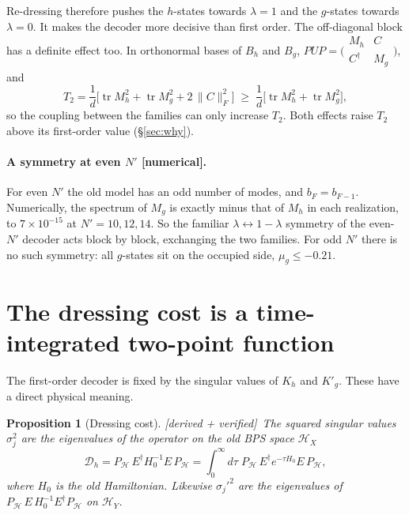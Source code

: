 \documentclass[11pt]{article}
\newcommand{\tr}{\operatorname{tr}}
\newcommand{\Np}{N'}
\newcommand{\Hc}{\mathcal H}
\newcommand{\Kh}{K_h}
\newcommand{\Kg}{{K'_g}}
\newcommand{\tagbox}[2]{\textsf{\small\color{#1}[#2]}}
\newcommand{\VER}{\tagbox{cder}{derived + verified}}
\newcommand{\NUM}{\tagbox{cnum}{numerical}}
\theoremstyle{plain}
\newtheorem{proposition}{Proposition}
\theoremstyle{remark}
\numberwithin{equation}{section}
\begin{document}
Re-dressing therefore pushes the $h$-states towards $\lambda=1$ and the $g$-states towards $\lambda=0$. It makes the decoder
more decisive than first order. The off-diagonal block has a definite effect too. In orthonormal bases of $B_h$ and $B_g$,
$PUP=\big(\begin{smallmatrix}M_h&C\\ C^\dagger&M_g\end{smallmatrix}\big)$, and
\begin{equation}\label{eq:T2mix}
T_2=\frac1d\Big[\tr M_h^2+\tr M_g^2+2\,\|C\|_F^2\Big]\;\ge\;\frac1d\Big[\tr M_h^2+\tr M_g^2\Big],
\end{equation}
so the coupling between the families can only increase $T_2$. Both effects raise $T_2$ above its first-order value
(\S\ref{sec:why}).

\paragraph{A symmetry at even $\Np$ \NUM.} For even $\Np$ the old model has an odd number of modes, and
$b_F=b_{F-1}$. Numerically, the spectrum of $M_g$ is exactly minus that of $M_h$ in each realization, to $7\times10^{-15}$
at $\Np=10,12,14$. So the familiar $\lambda\leftrightarrow1-\lambda$ symmetry of the even-$\Np$ decoder acts block by
block, exchanging the two families. For odd $\Np$ there is no such symmetry: all $g$-states sit on the occupied side,
$\mu_g\le-0.21$.

\section{The dressing cost is a time-integrated two-point function}\label{sec:twopoint}

The first-order decoder is fixed by the singular values of $\Kh$ and $\Kg$. These have a direct physical meaning.

\begin{proposition}[Dressing cost]\label{prop:twopoint}\VER\
The squared singular values $\sigma_j^2$ are the eigenvalues of the operator on the old BPS space $\Hc_X$
\begin{equation}\label{eq:Dh}
\mathcal D_h=P_{\Hc}\,E^\dagger H_0^{-1}E\,P_{\Hc}=\int_0^\infty d\tau\;P_{\Hc}\,E^\dagger e^{-\tau H_0}E\,P_{\Hc},
\end{equation}
where $H_0$ is the old Hamiltonian. Likewise $\sigma_j'^2$ are the eigenvalues of
$P_{\Hc}\,E\,H_0^{-1}E^\dagger P_{\Hc}$ on $\Hc_Y$.
\end{proposition}
\end{document}
